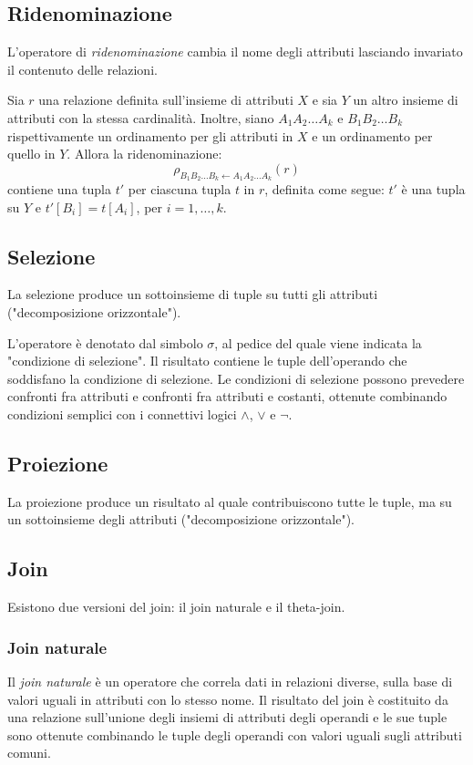 \documentclass[11pt]{book}
\begin{document}
\subsection{Ridenominazione}
L'operatore di \textit{ridenominazione} cambia il nome degli attributi lasciando invariato il contenuto delle relazioni.

Sia $r$ una relazione definita sull'insieme di attributi $X$ e sia $Y$ un altro insieme di attributi con la stessa cardinalità.
Inoltre, siano $A_1 A_2 \dots A_k$ e $B_1 B_2 \dots B_k$ rispettivamente un ordinamento per gli attributi in $X$ e un 
ordinamento per quello in $Y$. Allora la ridenominazione:
\begin{equation*}
    \rho_{B_1 B_2 \dots B_k\leftarrow A_1 A_2 \dots A_k}(r)
\end{equation*}
contiene una tupla $t'$ per ciascuna tupla $t$ in $r$, definita come segue: $t'$ è una tupla su $Y$ e $t'[B_i]=t[A_i]$, 
per $i=1,\dots ,k$.
\subsection{Selezione}
La selezione produce un sottoinsieme di tuple su tutti gli attributi ("decomposizione orizzontale").

L'operatore è denotato dal simbolo $\sigma$, al pedice del quale viene indicata la "condizione di selezione". Il risultato 
contiene le tuple dell'operando che soddisfano la condizione di selezione.
Le condizioni di selezione possono prevedere confronti fra attributi e confronti fra attributi e costanti, ottenute 
combinando condizioni semplici con i connettivi logici $\wedge$, $\vee$ e $\lnot$.
\subsection{Proiezione}
La proiezione produce un risultato al quale contribuiscono tutte le tuple, ma su un sottoinsieme degli attributi ("decomposizione 
orizzontale").
\subsection{Join}
Esistono due versioni del join: il join naturale e il theta-join.
\subsubsection{Join naturale}
Il \textit{join naturale} è un operatore che correla dati in relazioni diverse, sulla base di valori uguali in attributi 
con lo stesso nome. Il risultato del join è costituito da una relazione sull'unione degli insiemi di attributi degli 
operandi e le sue tuple sono ottenute combinando le tuple degli operandi con valori uguali sugli attributi comuni.
\end{document}
